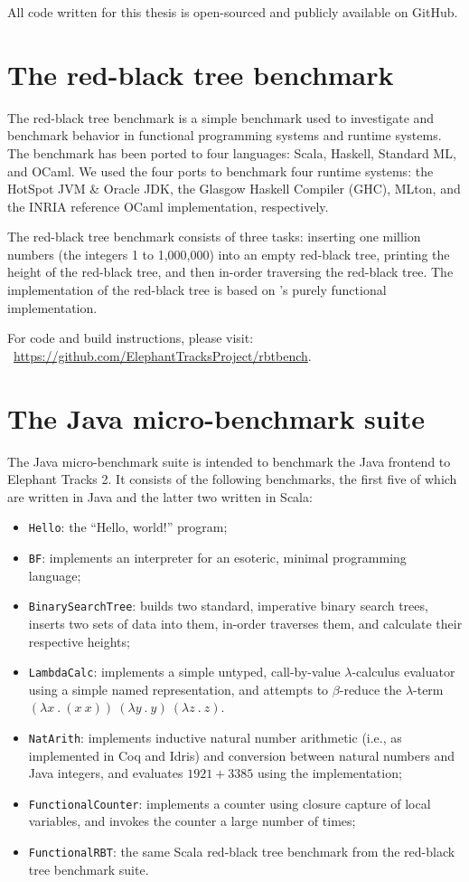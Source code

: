 All code written for this thesis is open-sourced and publicly available on GitHub.

\section{The red-black tree benchmark}
The red-black tree benchmark is a simple benchmark used to investigate and benchmark behavior in functional programming
systems and runtime systems. The benchmark has been ported to four languages: Scala, Haskell, Standard ML, and OCaml. We
used the four ports to benchmark four runtime systems: the HotSpot JVM \& Oracle JDK, the Glasgow Haskell Compiler (GHC),
MLton, and the INRIA reference OCaml implementation, respectively.

The red-black tree benchmark consists of three tasks: inserting one million numbers (the integers 1 to 1,000,000) into
an empty red-black tree, printing the height of the red-black tree, and then in-order traversing the red-black tree. The
implementation of the red-black tree is based on \cite{PFDS}'s purely functional implementation.

For code and build instructions, please visit: ~\url{https://github.com/ElephantTracksProject/rbtbench}.

\section{The Java micro-benchmark suite}
The Java micro-benchmark suite is intended to benchmark the Java frontend to Elephant Tracks 2. It consists of the
following benchmarks, the first five of which are written in Java and the latter two written in Scala:
\begin{itemize}
\item \lstinline{Hello}: the ``Hello, world!'' program;
\item \lstinline{BF}: implements an interpreter for an esoteric, minimal programming language;
\item \lstinline{BinarySearchTree}: builds two standard, imperative binary search trees, inserts two sets of data into them,
in-order traverses them, and calculate their respective heights;
\item \lstinline{LambdaCalc}: implements a simple untyped, call-by-value $\lambda$-calculus evaluator using a simple named representation, and attempts
to $\beta$-reduce the $\lambda$-term $(\lambda x \ . \ (x \ x)) \ (\lambda y \ . \ y) \ (\lambda z \ . \ z)$.
\item \lstinline{NatArith}: implements inductive natural number arithmetic (i.e., as implemented in Coq and Idris) and
conversion between natural numbers and Java integers, and evaluates $1921 + 3385$ using the implementation;
\item \lstinline{FunctionalCounter}: implements a counter using closure capture of local variables, and invokes the counter
a large number of times;
\item \lstinline{FunctionalRBT}: the same Scala red-black tree benchmark from the red-black tree benchmark suite.
\end{itemize}

